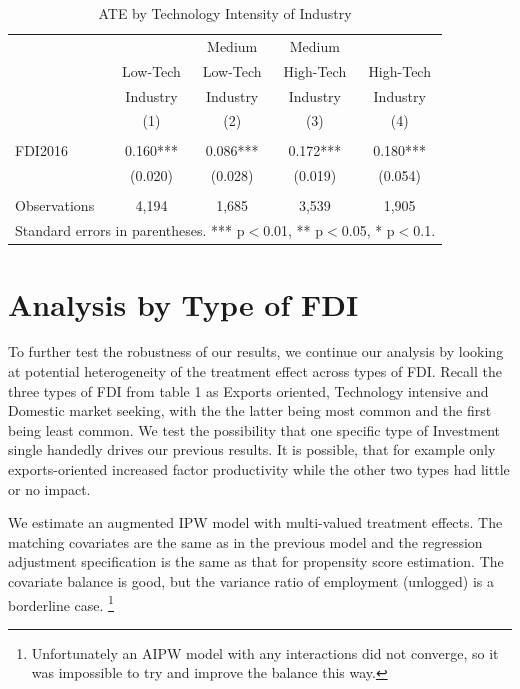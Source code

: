 \documentclass[a4paper,11pt]{scrartcl}
\begin{document}
\begin{table}[h]
  \centering
   \caption{ATE by Technology Intensity of Industry}
   \label{tab:TECH}
\begin{threeparttable}
 
\begin{tabular}{lcccc}
 \hline
 \hline
 & & Medium & Medium &  \\ 
 & Low-Tech & Low-Tech & High-Tech & High-Tech \\ 
 & Industry & Industry & Industry & Industry \\ 
 & (1) & (2) & (3) & (4) \\
 \hline
 &  &  &  &  \\
FDI2016 & 0.160*** & 0.086*** & 0.172*** & 0.180*** \\
	      & (0.020) & (0.028) & (0.019) & (0.054) \\
	      &  &  &  &  \\
 Observations & 4,194 & 1,685 & 3,539 & 1,905 \\ 
	\hline
	\hline
	\multicolumn{5}{c}{\footnotesize{Standard errors in parentheses. *** p$<$0.01, ** p$<$0.05, * p$<$0.1. }}
\end{tabular}

\end{threeparttable}
\end{table}


\section{Analysis by Type of FDI}


To further test the robustness of our results, we continue our analysis by looking at potential heterogeneity of the treatment effect across types of FDI. Recall the three types of FDI from table 1 as Exports oriented, Technology intensive and Domestic market seeking, with the the latter being most common and the first being least common.
We test the possibility that one specific type of Investment single handedly drives our previous results.  It is possible, that for example only exports-oriented increased factor productivity while the other two types had little or no impact. 

We estimate an augmented IPW model with multi-valued treatment effects. The matching covariates are the same as in the previous model and the regression adjustment specification is the same as that for propensity score estimation. The covariate balance is good, but the variance ratio of employment (unlogged) is a borderline case. \footnote{Unfortunately an AIPW model with any interactions did not converge, so it was impossible to try and improve the balance this way.}%
\end{document}
